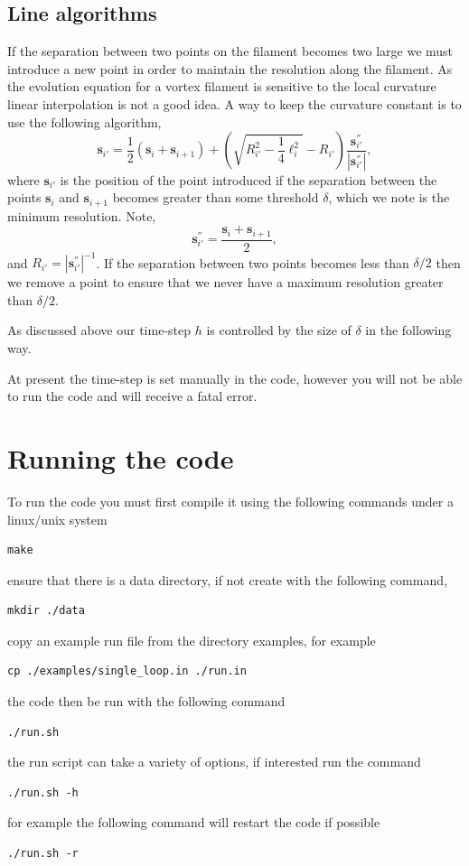 \documentclass[12pt]{article}
\newcommand{\bs}{\mathbf{s}}
\begin{document}
\subsection{Line algorithms}
  If the separation between two points on the filament becomes two large we must introduce a new point in order to maintain the resolution along the filament.
As the evolution equation for a vortex filament is sensitive to the local curvature linear interpolation is not a good idea.
A way to keep the curvature constant is to use the following algorithm,
\begin{equation}
\bs_{i'}=\frac{1}{2}(\bs_i+\bs_{i+1})+\left( \sqrt{R^2_{i'}-\frac{1}{4}\ell_i^2}-R_{i'} \right)\frac{\bs_{i'}^{''}}{|\bs_{i'}^{''}|},
\end{equation}
where $\bs_{i'}$ is the position of the point introduced if the separation between the points $\bs_{i}$ and $\bs_{i+1}$  becomes greater than some threshold $\delta$, which we note is the minimum resolution.
Note, 
\begin{equation}
\bs^{''}_{i'}=\frac{\bs_i+\bs_{i+1}}{2},
\end{equation}
and $R_{i'}=|\bs_{i'}^{''}|^{-1}$.
If the separation between two points becomes less than $\delta/2$ then we remove a point to ensure that we never have a maximum resolution greater than $\delta/2$. 

As discussed above our time-step $h$ is controlled by the size of $\delta$ in the following way.

At present the time-step is set manually in the code, however you will not be able to run the code and will receive a fatal error.

\section{Running the code}
To run the code you must first compile it using the following commands under a linux/unix system
\begin{verbatim}
make
\end{verbatim}
ensure that there is a data directory, if not create with the following command,
\begin{verbatim}
mkdir ./data
\end{verbatim}
copy an example run file from the directory examples, for example
\begin{verbatim}
cp ./examples/single_loop.in ./run.in
\end{verbatim}
the code then be run with the following command
\begin{verbatim}
./run.sh
\end{verbatim}
the run script can take a variety of options, if interested run the command
\begin{verbatim}
./run.sh -h
\end{verbatim}
for example the following command will restart the code if possible
\begin{verbatim}
./run.sh -r
\end{verbatim}
\end{document}
